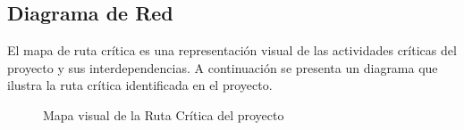 \subsection{Diagrama de Red}
El mapa de ruta crítica es una representación visual de las actividades críticas del proyecto y sus interdependencias. A continuación se presenta un diagrama que ilustra la ruta crítica identificada en el proyecto.

\begin{figure}[H]
  \centering
  \caption{Mapa visual de la Ruta Crítica del proyecto}
\end{figure}
